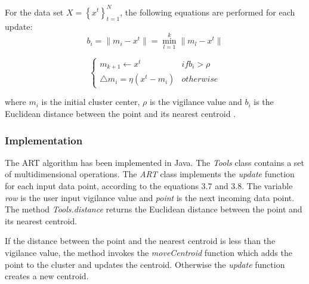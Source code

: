 \documentclass{lmproj}
\begin{document}
For the data set $X = \left\{ {x^{t}}\right\}_{t=1}^N$, the following equations are performed for each update:
\begin{equation}
b_{i} = \parallel{m_{i}} - x^{t}\parallel  = \min_{l=1}^k \parallel  m_{l} - x^{t}∥
\end{equation}
 
\begin{equation}
\begin{cases}
m_{k+1}\leftarrow x^{t} & if b_{i}>\rho
\\\triangle{m_{i}}=\eta\left(x^{t} - m_{i}\right) & otherwise
\end{cases}
\end{equation}

where $m_{i}$ is the initial cluster center, $\rho$ is the vigilance value and $b_{i}$ is the  Euclidean distance between the point and its nearest centroid \cite{Clustering}.


\subsubsection{Implementation}
The ART algorithm has been implemented in Java. The \textit{Tools} class contains a set of multidimensional operations. The \textit{ART} class implements the \textit{update} function for each input data point, according to the equations 3.7 and 3.8. The variable \textit{row} is the user input vigilance value and \textit{point} is the next incoming data point. The method \textit{Tools.distance} returns the  Euclidean distance between the point and its nearest centroid.



If the distance between the point and the nearest centroid is less than the vigilance value, the method invokes the \textit{moveCentroid} function which adds the point to the cluster and updates the centroid. Otherwise the \textit{update} function creates a new centroid.


\end{document}
